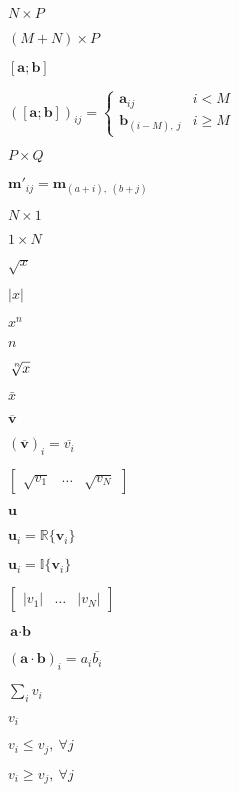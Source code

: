 \documentclass{article}
\begin{document}
{{{$ N \times P $
\pagebreak

$ \left(M+N\right) \times P $
\pagebreak

$ \left[\textbf{a}; \textbf{b}\right] $
\pagebreak

$ \left(\left[\textbf{a}; \textbf{b}\right]\right)_{ij} = \begin{cases} \textbf{a}_{ij} & i < M\\ \textbf{b}_{\left(i - M\right),\ j} & i \ge M \end{cases} $
\pagebreak

$ P \times Q $
\pagebreak

$ {\textbf{m}'}_{ij} = \textbf{m}_{\left(a + i\right),\ \left(b + j\right)} $
\pagebreak

$ N \times 1 $
\pagebreak

$ 1 \times N $
\pagebreak

$ \sqrt{x} $
\pagebreak

$ \lvert x \rvert $
\pagebreak

$ x^n $
\pagebreak

$n$
\pagebreak

$ \sqrt[\leftroot{-2}\uproot{2}n]{x} $
\pagebreak

$ \bar{x} $
\pagebreak

$ \overline{\textbf{v}} $
\pagebreak

$ \left(\overline{\textbf{v}}\right)_i = \overline{v_i} $
\pagebreak

$ \begin{bmatrix} \sqrt{v_1} & \ldots &\sqrt{v_N} \end{bmatrix} $
\pagebreak

$ \textbf{u} $
\pagebreak

$ \textbf{u}_i = \mathbb{R}\{\textbf{v}_i\} $
\pagebreak

$ \textbf{u}_i = \mathbb{I}\{\textbf{v}_i\} $
\pagebreak

$ \begin{bmatrix} \lvert v_1 \rvert & \ldots & \lvert v_N \rvert \end{bmatrix} $
\pagebreak

$ \textbf{a} \cdot \textbf{b} $
\pagebreak

$ \left(\textbf{a}\cdot\textbf{b}\right)_i = a_i \overline{b_i} $
\pagebreak

$ \sum\limits_{i} v_i $
\pagebreak

$ v_i $
\pagebreak

$ v_i \leq v_j,\ \forall j $
\pagebreak

$ v_i \geq v_j,\ \forall j $
\pagebreak

}}}
\end{document}
